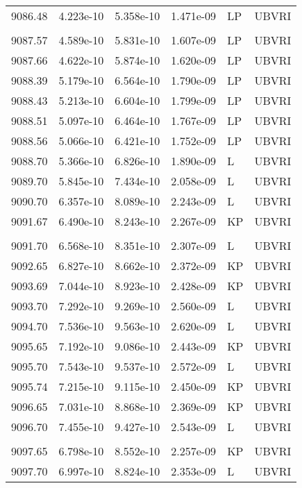 \begin{center}
\begin{tabular} {l l c c l l}
   9086.48  &  4.223e-10  &  5.358e-10  &  1.471e-09 &  LP & UBVRI  \\
 \\
   9087.57  &  4.589e-10  &  5.831e-10  &  1.607e-09 &  LP & UBVRI  \\
   9087.66  &  4.622e-10  &  5.874e-10  &  1.620e-09 &  LP & UBVRI  \\
   9088.39  &  5.179e-10  &  6.564e-10  &  1.790e-09 &  LP & UBVRI  \\
   9088.43  &  5.213e-10  &  6.604e-10  &  1.799e-09 &  LP & UBVRI  \\
   9088.51  &  5.097e-10  &  6.464e-10  &  1.767e-09 &  LP & UBVRI  \\
   9088.56  &  5.066e-10  &  6.421e-10  &  1.752e-09 &  LP & UBVRI  \\
   9088.70  &  5.366e-10  &  6.826e-10  &  1.890e-09 &  L& UBVRI  \\
   9089.70  &  5.845e-10  &  7.434e-10  &  2.058e-09 &  L& UBVRI  \\
   9090.70  &  6.357e-10  &  8.089e-10  &  2.243e-09 &  L& UBVRI  \\
   9091.67  &  6.490e-10  &  8.243e-10  &  2.267e-09 &  KP& UBVRI  \\
 \\ 
   9091.70  &  6.568e-10  &  8.351e-10  &  2.307e-09 &  L& UBVRI  \\
   9092.65  &  6.827e-10  &  8.662e-10  &  2.372e-09 &  KP& UBVRI  \\
   9093.69  &  7.044e-10  &  8.923e-10  &  2.428e-09 &  KP& UBVRI  \\
   9093.70  &  7.292e-10  &  9.269e-10  &  2.560e-09 &  L& UBVRI  \\
   9094.70  &  7.536e-10  &  9.563e-10  &  2.620e-09 &  L& UBVRI  \\
   9095.65  &  7.192e-10  &  9.086e-10  &  2.443e-09 &  KP &UBVRI  \\
   9095.70  &  7.543e-10  &  9.537e-10  &  2.572e-09 &  L &UBVRI  \\
   9095.74  &  7.215e-10  &  9.115e-10  &  2.450e-09 &  KP &UBVRI  \\
   9096.65  &  7.031e-10  &  8.868e-10  &  2.369e-09 &  KP &UBVRI  \\
   9096.70  &  7.455e-10  &  9.427e-10  &  2.543e-09 &  L &UBVRI  \\
 \\
   9097.65  &  6.798e-10  &  8.552e-10  &  2.257e-09 &  KP &UBVRI  \\
   9097.70  &  6.997e-10  &  8.824e-10  &  2.353e-09 &  L &UBVRI  \\

\end{tabular}
\end{center}
